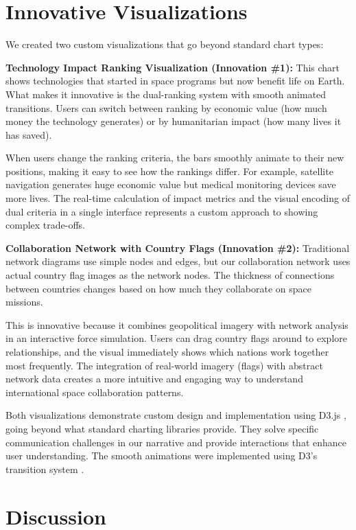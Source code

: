 \documentclass[sigconf]{acmart}
\begin{document}
\section{Innovative Visualizations}

We created two custom visualizations that go beyond standard chart types:

\textbf{Technology Impact Ranking Visualization (Innovation \#1):} This chart shows technologies that started in space programs but now benefit life on Earth. What makes it innovative is the dual-ranking system with smooth animated transitions. Users can switch between ranking by economic value (how much money the technology generates) or by humanitarian impact (how many lives it has saved). 

When users change the ranking criteria, the bars smoothly animate to their new positions, making it easy to see how the rankings differ. For example, satellite navigation generates huge economic value but medical monitoring devices save more lives. The real-time calculation of impact metrics and the visual encoding of dual criteria in a single interface represents a custom approach to showing complex trade-offs.

\textbf{Collaboration Network with Country Flags (Innovation \#2):} Traditional network diagrams use simple nodes and edges, but our collaboration network uses actual country flag images as the network nodes. The thickness of connections between countries changes based on how much they collaborate on space missions.

This is innovative because it combines geopolitical imagery with network analysis in an interactive force simulation. Users can drag country flags around to explore relationships, and the visual immediately shows which nations work together most frequently. The integration of real-world imagery (flags) with abstract network data creates a more intuitive and engaging way to understand international space collaboration patterns.

Both visualizations demonstrate custom design and implementation using D3.js \cite{D3Documentation}, going beyond what standard charting libraries provide. They solve specific communication challenges in our narrative and provide interactions that enhance user understanding. The smooth animations were implemented using D3's transition system \cite{D3Transitions}.

\section{Discussion}
\end{document}
